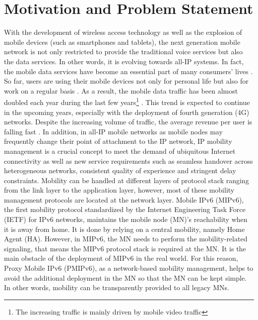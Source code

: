 \section{Motivation and Problem Statement}
With the development of wireless access technology as well as the explosion of mobile devices (such as smartphones and tablets), the next generation mobile network is not only restricted to provide the traditional voice services but also the data services. In other words, it is evolving towards all-IP systems. In fact, the mobile data services have become an essential part of many consumers' lives \cite{cisco_forecast,data_services}. So far, users are using their mobile devices not only for personal life but also for work on a regular basis \cite{cisco_service,morgan_stanley, mobile_2010}. As a result, the mobile data traffic has been almost doubled each year during the last few years\footnote{The increasing traffic is mainly driven by mobile video traffic} \cite{cisco_forecast, ericsson}. This trend is expected to continue in the upcoming years, especially with the deployment of fourth generation (4G) networks. Despite the increasing volume of traffic, the average revenue per user is falling fast \cite{mobile_europe}. In addition, in all-IP mobile networks as mobile nodes may frequently change their point of attachment to the IP network, IP mobility management is a crucial concept to meet the demand of ubiquitous Internet connectivity as well as new service requirements such as seamless handover across heterogeneous networks, consistent quality of experience and stringent delay constraints. Mobility can be handled at different layers of protocol stack ranging from the link layer to the application layer, however, most of these mobility management protocols are located at the network layer. Mobile IPv6 (MIPv6), the first mobility protocol standardized by the Internet Engineering Task Force (IETF) for IPv6 networks, maintains the mobile node (MN)'s reachability when it is away from home. It is done by relying on a central mobility, namely Home Agent (HA). However, in MIPv6, the MN needs to perform the mobility-related signaling, that means the MIPv6 protocol stack is required at the MN. It is the main obstacle of the deployment of MIPv6 in the real world. For this reason, Proxy Mobile IPv6 (PMIPv6), as a network-based mobility management, helps to avoid the additional deployment in the MN so that the MN can be kept simple. In other words, mobility can be transparently provided to all legacy MNs. \\


